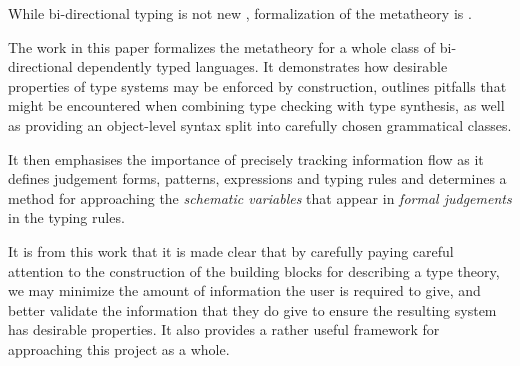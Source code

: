 While bi-directional typing is not new
\cite{DBLP:journals/toplas/PierceT00}, formalization of the metatheory
is \cite{TypesWhoSayNi}. 

The work in this paper formalizes the metatheory for a whole class of
bi-directional dependently typed languages. It demonstrates how
desirable properties of type systems may be enforced by construction,
outlines pitfalls that might be encountered when combining type
checking with type synthesis, as well as providing an object-level
syntax split into carefully chosen grammatical classes.

It then emphasises the importance of precisely tracking information
flow as it defines judgement forms, patterns, expressions and typing
rules and determines a method for approaching the \emph{schematic
  variables} that appear in \emph{formal judgements} in the typing
rules.

It is from this work that it is made clear that by carefully paying
careful attention to the construction of the building blocks for
describing a type theory, we may minimize the amount of information
the user is required to give, and better validate the information that
they do give to ensure the resulting system has desirable
properties. It also provides a rather useful framework for approaching
this project as a whole.


